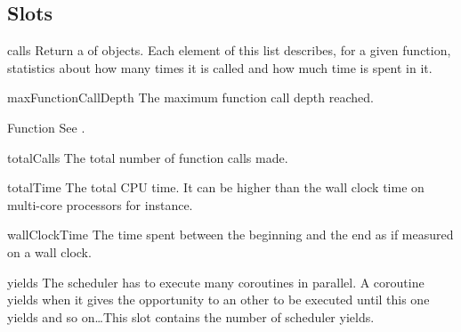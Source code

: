 \subsection{Slots}

\begin{urbiscriptapi}

\item[calls]%
  Return a  of  objects. Each
  element of this list describes, for a given function, statistics about how
  many times it is called and how much time is spent in it.

\item[maxFunctionCallDepth]%
  The maximum function call depth reached.

\item[Function] See .

\item[totalCalls]%
  The total number of function calls made.

\item[totalTime]%
  The total CPU time. It can be higher than the wall clock time on
  multi-core processors for instance.

\item[wallClockTime]%
  The time spent between the beginning and the end as if measured on a wall
  clock.

\item[yields]%
  The scheduler has to execute many coroutines in parallel. A coroutine
  yields when it gives the opportunity to an other to be executed until this
  one yields and so on\dots This slot contains the number of scheduler
  yields.

\end{urbiscriptapi}


